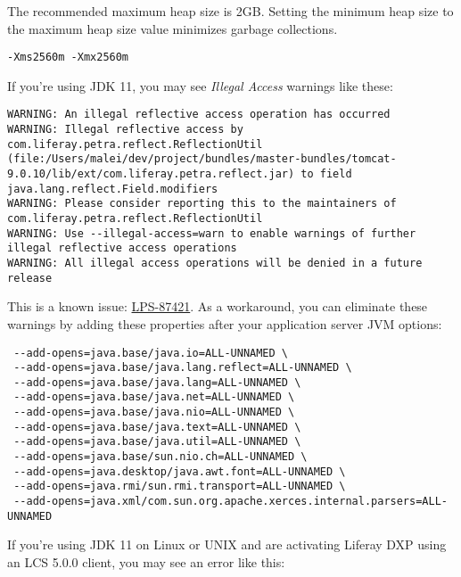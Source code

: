 \noindent\hrulefill

The recommended maximum heap size is 2GB. Setting the minimum heap size
to the maximum heap size value minimizes garbage collections.

\begin{verbatim}
-Xms2560m -Xmx2560m
\end{verbatim}

If you're using JDK 11, you may see \emph{Illegal Access} warnings like
these:

\begin{verbatim}
WARNING: An illegal reflective access operation has occurred
WARNING: Illegal reflective access by com.liferay.petra.reflect.ReflectionUtil (file:/Users/malei/dev/project/bundles/master-bundles/tomcat-9.0.10/lib/ext/com.liferay.petra.reflect.jar) to field java.lang.reflect.Field.modifiers
WARNING: Please consider reporting this to the maintainers of com.liferay.petra.reflect.ReflectionUtil
WARNING: Use --illegal-access=warn to enable warnings of further illegal reflective access operations
WARNING: All illegal access operations will be denied in a future release
\end{verbatim}

This is a known issue:
\href{https://issues.liferay.com/browse/LPS-87421}{LPS-87421}. As a
workaround, you can eliminate these warnings by adding these properties
after your application server JVM options:

\begin{verbatim}
 --add-opens=java.base/java.io=ALL-UNNAMED \
 --add-opens=java.base/java.lang.reflect=ALL-UNNAMED \
 --add-opens=java.base/java.lang=ALL-UNNAMED \
 --add-opens=java.base/java.net=ALL-UNNAMED \
 --add-opens=java.base/java.nio=ALL-UNNAMED \
 --add-opens=java.base/java.text=ALL-UNNAMED \
 --add-opens=java.base/java.util=ALL-UNNAMED \
 --add-opens=java.base/sun.nio.ch=ALL-UNNAMED \
 --add-opens=java.desktop/java.awt.font=ALL-UNNAMED \
 --add-opens=java.rmi/sun.rmi.transport=ALL-UNNAMED \
 --add-opens=java.xml/com.sun.org.apache.xerces.internal.parsers=ALL-UNNAMED
\end{verbatim}

If you're using JDK 11 on Linux or UNIX and are activating Liferay DXP
using an LCS 5.0.0 client, you may see an error like this:

